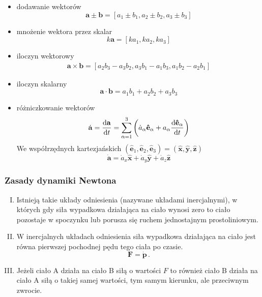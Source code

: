 \documentclass[../main.tex]{subfiles}
\begin{document}
\begin{itemize}
    \item dodawanie wektorów
    \begin{equation*}
        \mathbf{a}\pm\mathbf{b}=[a_1\pm b_1, a_2\pm b_2,a_3\pm b_3 ]
    \end{equation*}
    
    \item mnożenie wektora przez skalar
    \begin{equation*}
        k\mathbf{a}=[ka_1,ka_2,ka_3]
    \end{equation*}
    \item iloczyn wektorowy
    \begin{equation*}
    \begin{split}
       \mathbf{a}\times\mathbf{b}=[a_2b_3-a_3b_2,a_3b_1-a_1b_3,a_1b_2-a_2b_1]
    \end{split}
    \end{equation*}
    
    \item iloczyn skalarny
    \begin{equation*}
        \mathbf{a}\cdot\mathbf{b}=a_1b_1+a_2b_2+a_3b_3
    \end{equation*}
    \item różniczkowanie wektorów
    \begin{equation*}
        \dot{\mathbf{a}}=\dv{\mathbf{a}}{t}=\sum_{\alpha=1}^3\left(\dot a_\alpha\mathbf{\hat e}_\alpha+a_\alpha\dv{\mathbf{\hat e_\alpha}}{t}\right)
    \end{equation*}
    We współrzędnych kartezjańskich \((\mathbf{\hat e}_1,\mathbf{\hat e}_2,\mathbf{\hat
    e}_3)=(\mathbf{\hat x},\mathbf{\hat y},\mathbf{\hat z})\)
    \begin{equation*}
        \dot{\mathbf{a}}=\dot a_x\mathbf{\hat x}+\dot a_y\mathbf{\hat y}+\dot a_z\mathbf{\hat z}
    \end{equation*}
\end{itemize}
\subsubsection{Zasady dynamiki Newtona}
\begin{enumerate}[I.]
    \item Istnieją takie układy odniesienia (nazywane układami inercjalnymi), w których gdy siła
    wypadkowa działająca na ciało wynosi zero to ciało pozostaje w spoczynku lub porusza się ruchem
    jednostajnym prostoliniowym.
    \item W inercjalnych układach odniesienia siła wypadkowa działająca na ciało jest równa
    pierwszej pochodnej pędu tego ciała po czasie.
    \begin{equation*}
        \mathbf{F}=\dot{\mathbf{p}}\,.
    \end{equation*}
    \item Jeżeli ciało A działa na ciało B siłą o wartości \(F\) to również ciało B działa na ciało
    A siłą o takiej samej wartości, tym samym kierunku, ale przeciwnym zwrocie.
\end{enumerate}
\newpage
\end{document}
